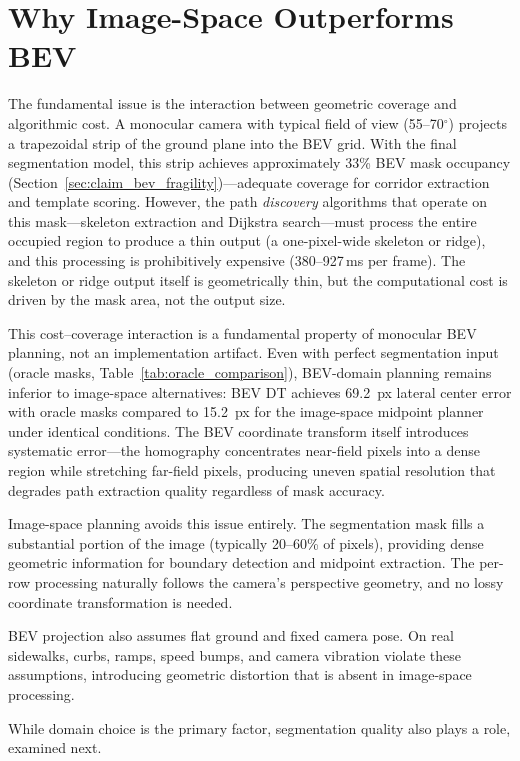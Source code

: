 \documentclass[12pt,letterpaper,oneside]{report}
\begin{document}
\section{Why Image-Space Outperforms BEV}

The fundamental issue is the interaction between geometric coverage and algorithmic cost.  A monocular camera with typical field of view (55--70$^\circ$) projects a trapezoidal strip of the ground plane into the BEV grid.  With the final segmentation model, this strip achieves approximately 33\% BEV mask occupancy (Section~\ref{sec:claim_bev_fragility})---adequate coverage for corridor extraction and template scoring.  However, the path \emph{discovery} algorithms that operate on this mask---skeleton extraction and Dijkstra search---must process the entire occupied region to produce a thin output (a one-pixel-wide skeleton or ridge), and this processing is prohibitively expensive (380--927\,ms per frame).  The skeleton or ridge output itself is geometrically thin, but the computational cost is driven by the mask area, not the output size.

This cost--coverage interaction is a fundamental property of monocular BEV planning, not an implementation artifact.  Even with perfect segmentation input (oracle masks, Table~\ref{tab:oracle_comparison}), BEV-domain planning remains inferior to image-space alternatives: BEV DT achieves 69.2~px lateral center error with oracle masks compared to 15.2~px for the image-space midpoint planner under identical conditions.  The BEV coordinate transform itself introduces systematic error---the homography concentrates near-field pixels into a dense region while stretching far-field pixels, producing uneven spatial resolution that degrades path extraction quality regardless of mask accuracy.

Image-space planning avoids this issue entirely.  The segmentation mask fills a substantial portion of the image (typically 20--60\% of pixels), providing dense geometric information for boundary detection and midpoint extraction.  The per-row processing naturally follows the camera's perspective geometry, and no lossy coordinate transformation is needed.

BEV projection also assumes flat ground and fixed camera pose.  On real sidewalks, curbs, ramps, speed bumps, and camera vibration violate these assumptions, introducing geometric distortion that is absent in image-space processing.

While domain choice is the primary factor, segmentation quality also plays a role, examined next.
\end{document}
